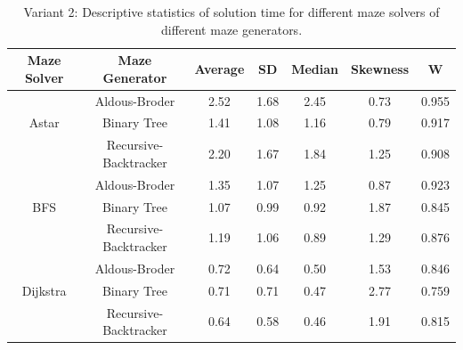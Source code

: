          \begin{table}[!ht]
            \centering
            \caption{Variant 2: Descriptive statistics of solution time for different maze solvers of different maze generators.} 
            \begin{tabular}{c c c c c c c}
            \hline
                Maze Solver & Maze Generator & Average & SD & Median & Skewness & W\\ \hline
                ~ & Aldous-Broder  & 2.52 & 1.68 & 2.45 & 0.73 & 0.955\\ 
                Astar & Binary Tree & 1.41 & 1.08 & 1.16 & 0.79 & 0.917\\ 
                ~ & Recursive-Backtracker & 2.20 & 1.67 & 1.84 & 1.25 & 0.908\\ \hline
                ~ & Aldous-Broder  & 1.35 & 1.07 & 1.25 & 0.87 & 0.923\\ 
                BFS & Binary Tree & 1.07 & 0.99 & 0.92 & 1.87 & 0.845 \\ 
                ~ & Recursive-Backtracker & 1.19 & 1.06 & 0.89 & 1.29 & 0.876\\ \hline
                ~ & Aldous-Broder & 0.72 & 0.64 & 0.50 & 1.53 & 0.846 \\ 
                Dijkstra & Binary Tree & 0.71 & 0.71 & 0.47 & 2.77 & 0.759\\ 
                ~ & Recursive-Backtracker & 0.64 & 0.58 & 0.46 & 1.91 & 0.815 \\ \hline
            \end{tabular}
        \end{table}
\newpage
